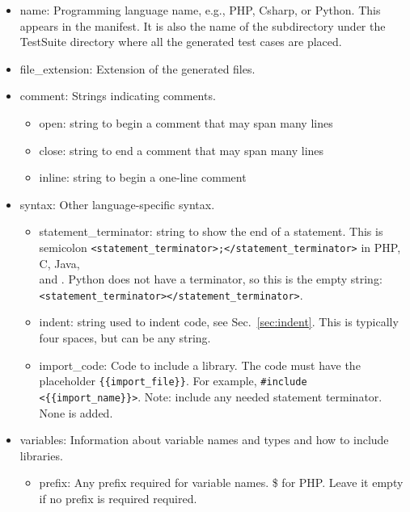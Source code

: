 \begin{itemize}
    \item name: Programming language name, e.g., PHP, Csharp,
    or Python. This appears in the manifest.
    It is also the name of the subdirectory under the TestSuite directory
    where all the generated test cases are placed.

    \item file\_extension: Extension of the generated files.

    \item comment: Strings indicating comments.
    \begin{itemize}
        \item open: string to begin a comment that may span many lines
        \item close: string to end a comment that may span many lines
        \item inline: string to begin a one-line comment
    \end{itemize}
    
    \item syntax: Other language-specific syntax.
    \begin{itemize}
        \item statement\_terminator: string to show the end of 
        a statement.
        This is semicolon
        \verb|<statement_terminator>;</statement_terminator>|
        in PHP, C, Java, \\ and \CSharp. Python does not have 
        a terminator, so this is the empty string: \\
        \verb|<statement_terminator></statement_terminator>|.

        \item indent: string used to indent code, see Sec.~\ref{sec:indent}.
          This is typically four spaces, but
          can be any string.

        \item import\_code: Code to include a library. The code
        must have the placeholder \verb|{{import_file}}|.
        For example, \verb|#include <{{import_name}}>|.
        Note: include any needed statement terminator.  None is added.
    \end{itemize}
    
    \item variables: Information about variable names and types and how
    to include libraries.
    \begin{itemize}
        \item prefix: Any prefix required for variable names.
        \$ for PHP.
        Leave it empty if no prefix is required required.


\end{itemize}
\end{itemize}

